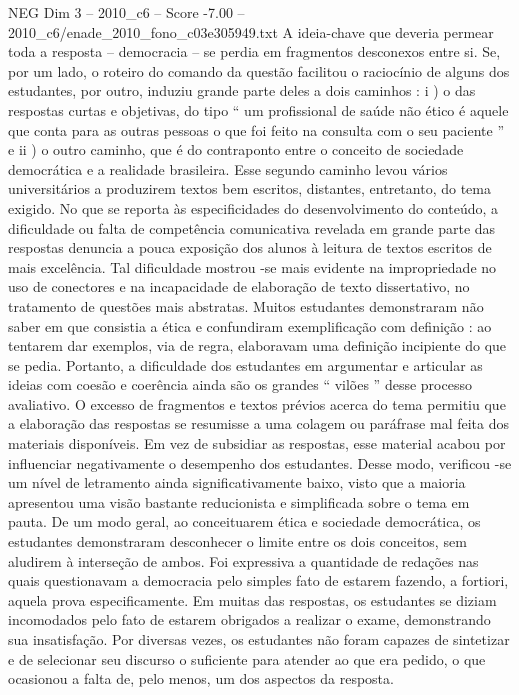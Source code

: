\begin{textsample}{NEG Dim 3 – 2010\_c6 – Score -7.00 – 2010\_c6/enade\_2010\_fono\_c03e305949.txt}
A ideia-chave que deveria permear toda a resposta – democracia – se perdia em fragmentos desconexos entre si.
Se, por um lado, o roteiro do comando da questão facilitou o raciocínio de alguns dos estudantes, por outro, induziu grande parte deles a dois caminhos : i ) o das respostas curtas e objetivas, do tipo “ um profissional de saúde não ético é aquele que conta para as outras pessoas o que foi feito na consulta com o seu paciente ” e ii ) o outro caminho, que é do contraponto entre o conceito de sociedade democrática e a realidade brasileira.
Esse segundo caminho levou vários universitários a produzirem textos bem escritos, distantes, entretanto, do tema exigido.
No que se reporta às especificidades do desenvolvimento do conteúdo, a dificuldade ou falta de competência comunicativa revelada em grande parte das respostas denuncia a pouca exposição dos alunos à leitura de textos escritos de mais excelência.
Tal dificuldade mostrou -se mais evidente na impropriedade no uso de conectores e na incapacidade de elaboração de texto dissertativo, no tratamento de questões mais abstratas.
Muitos estudantes demonstraram não saber em que consistia a ética e confundiram exemplificação com definição : ao tentarem dar exemplos, via de regra, elaboravam uma definição incipiente do que se pedia.
Portanto, a dificuldade dos estudantes em argumentar e articular as ideias com coesão e coerência ainda são os grandes “ vilões ” desse processo avaliativo.
O excesso de fragmentos e textos prévios acerca do tema permitiu que a elaboração das respostas se resumisse a uma colagem ou paráfrase mal feita dos materiais disponíveis.
Em vez de subsidiar as respostas, esse material acabou por influenciar negativamente o desempenho dos estudantes.
Desse modo, verificou -se um nível de letramento ainda significativamente baixo, visto que a maioria apresentou uma visão bastante reducionista e simplificada sobre o tema em pauta.
De um modo geral, ao conceituarem ética e sociedade democrática, os estudantes demonstraram desconhecer o limite entre os dois conceitos, sem aludirem à interseção de ambos.
Foi expressiva a quantidade de redações nas quais questionavam a democracia pelo simples fato de estarem fazendo, a fortiori, aquela prova especificamente.
Em muitas das respostas, os estudantes se diziam incomodados pelo fato de estarem obrigados a realizar o exame, demonstrando sua insatisfação.
Por diversas vezes, os estudantes não foram capazes de sintetizar e de selecionar seu discurso o suficiente para atender ao que era pedido, o que ocasionou a falta de, pelo menos, um dos aspectos da resposta.

\end{textsample}
